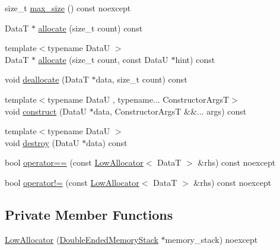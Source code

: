 \begin{DoxyCompactItemize}
\item 
size\+\_\+t \hyperlink{structmage_1_1_double_ended_memory_stack_1_1_low_allocator_a3c93f7d3dd550ab89dbb147d0c4e8294}{max\+\_\+size} () const noexcept
\item 
DataT $\ast$ \hyperlink{structmage_1_1_double_ended_memory_stack_1_1_low_allocator_a447a18b6db5720cac0f8ffcf09eb7446}{allocate} (size\+\_\+t count) const
\item 
{\footnotesize template$<$typename DataU $>$ }\\DataT $\ast$ \hyperlink{structmage_1_1_double_ended_memory_stack_1_1_low_allocator_a799bd33b5a3453be2243baf0769b5826}{allocate} (size\+\_\+t count, const DataU $\ast$hint) const
\item 
void \hyperlink{structmage_1_1_double_ended_memory_stack_1_1_low_allocator_aefdcd757a7228d3f9e4bc3f99d6a5d5f}{deallocate} (DataT $\ast$data, size\+\_\+t count) const
\item 
{\footnotesize template$<$typename DataU , typename... Constructor\+ArgsT$>$ }\\void \hyperlink{structmage_1_1_double_ended_memory_stack_1_1_low_allocator_ad973ac339f277f0b953a439e2123ad83}{construct} (DataU $\ast$data, Constructor\+ArgsT \&\&... args) const
\item 
{\footnotesize template$<$typename DataU $>$ }\\void \hyperlink{structmage_1_1_double_ended_memory_stack_1_1_low_allocator_a05981dee12d02f10a96427f8bd44344d}{destroy} (DataU $\ast$data) const
\item 
bool \hyperlink{structmage_1_1_double_ended_memory_stack_1_1_low_allocator_a0f2458c29c58b914e5595b8f614702f5}{operator==} (const \hyperlink{structmage_1_1_double_ended_memory_stack_1_1_low_allocator}{Low\+Allocator}$<$ DataT $>$ \&rhs) const noexcept
\item 
bool \hyperlink{structmage_1_1_double_ended_memory_stack_1_1_low_allocator_a999a32dfba729a1a0d7d195021ace3d4}{operator!=} (const \hyperlink{structmage_1_1_double_ended_memory_stack_1_1_low_allocator}{Low\+Allocator}$<$ DataT $>$ \&rhs) const noexcept
\end{DoxyCompactItemize}
\subsection*{Private Member Functions}
\begin{DoxyCompactItemize}
\item 
\hyperlink{structmage_1_1_double_ended_memory_stack_1_1_low_allocator_a7c9da2fad702eedb0bb16de047c99238}{Low\+Allocator} (\hyperlink{classmage_1_1_double_ended_memory_stack}{Double\+Ended\+Memory\+Stack} $\ast$memory\+\_\+stack) noexcept
\end{DoxyCompactItemize}

